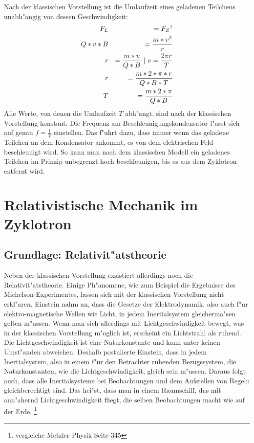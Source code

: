 \documentclass[14pt, a4paper]{report}
\begin{document}
Nach der klassischen Vorstellung ist die Umlaufzeit eines geladenen Teilchens 
unabh"angig von dessen Geschwindigkeit:
\begin{eqnarray}
  F_L  		&& = F_Z  \footnotemark  \\
  Q * v * B 	&& = \frac{m * v^2}{r} \label{Radius im Zyklotron}\\
  r		&& = \frac{m * v}{Q * B}  ~ | ~ v = \frac{2\pi r}{T} \\
  r		&& = \frac{m * 2 * \pi * r}{Q * B * T} \\
  T		&& = \frac{m * 2 * \pi }{Q * B} \label{klassische_Umlaufzeit}
\end{eqnarray}
Alle Werte, von denen die Umlaufzeit $T$ abh"angt, 
sind nach der klassischen Vorstellung konstant. 
Die Frequenz am Beschleunigungskondensator l"asst sich auf genau $f = \frac{1}{T}$
einstellen. Das f"uhrt dazu, dass immer wenn das geladene Teilchen an dem Kondensator 
ankommt, es von dem elektrischen Feld beschleunigt wird. So kann man nach dem klassischen Modell
ein geladenes Teilchen im Prinzip unbegrenzt hoch beschleunigen, bis es aus dem
Zyklotron entfernt wird. \label{klassische_Erwartung}

\chapter{Relativistische Mechanik im Zyklotron}
\section{Grundlage: Relativit"atstheorie}
Neben der klassischen Vorstellung exsistiert allerdings noch die 
Relativit"atstheorie. Einige Ph"anomene, wie zum Beispiel die Ergebnisse 
des Michelson-Experimentes,
lassen sich mit der klassischen Vorstellung nicht erkl"aren. Einstein nahm an, dass 
die Gesetze der Elektrodynamik, also auch f"ur elektro-magnetische Wellen wie Licht,
in jedem Inertialsystem gleicherma"sen gelten m"ussen. 
Wenn man sich allerdings mit Lichtgeschwindigkeit bewegt, was in der klassischen Vorstellung 
m"oglich ist, erscheint ein Lichtstrahl als ruhend. 
Die Lichtgeschwindigkeit ist eine Naturkonstante und kann unter keinen 
Umst"anden abweichen. Deshalb postulierte Einstein, dass in jedem Inertialsystem, also in
einem f"ur den Betrachter ruhenden Bezugssystem, die 
Naturkonstanten, wie die Lichtgeschwindigkeit, gleich sein m"ussen. Daraus folgt auch,
dass alle Inertialsysteme bei Beobachtungen und dem Aufstellen von Regeln gleichberechtigt sind. 
Das hei"st, dass man in einem Raumschiff, das mit ann"ahernd Lichtgeschwindigkeit
fliegt, die selben Beobachtungen macht wie auf der Erde.
\footnote{vergleiche Metzler Physik Seite 345}
\end{document}
